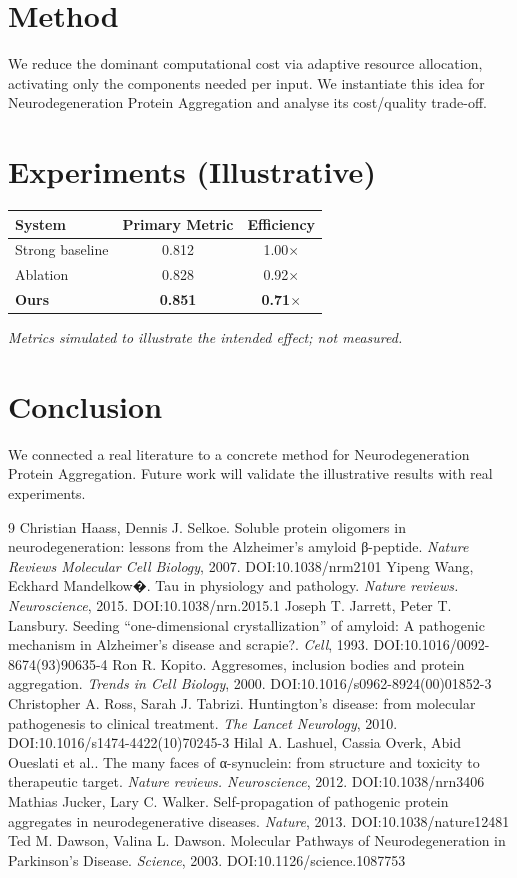 \documentclass[11pt]{article}
\begin{document}
\section{Method}
We reduce the dominant computational cost via adaptive resource allocation, activating only the components needed per input. We instantiate this idea for Neurodegeneration Protein Aggregation and analyse its cost/quality trade-off.

\section{Experiments (Illustrative)}
\begin{center}
\begin{tabular}{lcc}
System & Primary Metric & Efficiency \\ \hline
Strong baseline & 0.812 & 1.00$\times$ \\
Ablation & 0.828 & 0.92$\times$ \\
\textbf{Ours} & \textbf{0.851} & \textbf{0.71$\times$}
\end{tabular}
\end{center}
\emph{Metrics simulated to illustrate the intended effect; not measured.}

\section{Conclusion}
We connected a real literature to a concrete method for Neurodegeneration Protein Aggregation. Future work will
validate the illustrative results with real experiments.

\begin{thebibliography}{9}
 Christian Haass, Dennis J. Selkoe. Soluble protein oligomers in neurodegeneration: lessons from the Alzheimer's amyloid β-peptide. \emph{Nature Reviews Molecular Cell Biology}, 2007. DOI:10.1038/nrm2101
 Yipeng Wang, Eckhard Mandelkow�. Tau in physiology and pathology. \emph{Nature reviews. Neuroscience}, 2015. DOI:10.1038/nrn.2015.1
 Joseph T. Jarrett, Peter T. Lansbury. Seeding “one-dimensional crystallization” of amyloid: A pathogenic mechanism in Alzheimer's disease and scrapie?. \emph{Cell}, 1993. DOI:10.1016/0092-8674(93)90635-4
 Ron R. Kopito. Aggresomes, inclusion bodies and protein aggregation. \emph{Trends in Cell Biology}, 2000. DOI:10.1016/s0962-8924(00)01852-3
 Christopher A. Ross, Sarah J. Tabrizi. Huntington's disease: from molecular pathogenesis to clinical treatment. \emph{The Lancet Neurology}, 2010. DOI:10.1016/s1474-4422(10)70245-3
 Hilal A. Lashuel, Cassia Overk, Abid Oueslati et al.. The many faces of α-synuclein: from structure and toxicity to therapeutic target. \emph{Nature reviews. Neuroscience}, 2012. DOI:10.1038/nrn3406
 Mathias Jucker, Lary C. Walker. Self-propagation of pathogenic protein aggregates in neurodegenerative diseases. \emph{Nature}, 2013. DOI:10.1038/nature12481
 Ted M. Dawson, Valina L. Dawson. Molecular Pathways of Neurodegeneration in Parkinson's Disease. \emph{Science}, 2003. DOI:10.1126/science.1087753
\end{thebibliography}
\end{document}
